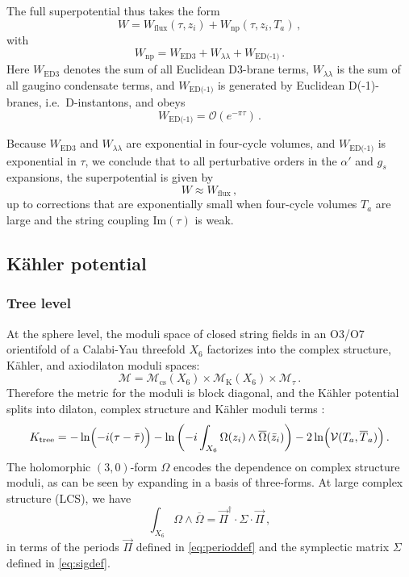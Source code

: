 \documentclass[12pt,a4wide]{article}
\def\V{\mathcal{V}}
\begin{document}
The full superpotential thus takes the form
\begin{equation}\label{eq:wtot}
W = W_{\text{flux}}(\tau,z_i) + W_{\text{np}}(\tau,z_i,T_a)\,,
\end{equation} with
\begin{equation}\label{eq:wnpgen}
W_{\text{np}} = W_{\text{ED3}} + W_{{\lambda\lambda}} +W_{\text{ED(-1)}}\,.
\end{equation}
Here $W_{\text{ED3}}$ denotes the sum of all Euclidean D3-brane terms, 
$W_{{\lambda\lambda}}$ is the sum of all gaugino condensate terms,
and $W_{\text{ED(-1)}}$ is generated by Euclidean D(-1)-branes, i.e.~D-instantons, and obeys
\begin{equation}\label{eq:wedminus}
W_{\text{ED(-1)}} = \mathcal{O}(e^{-\pi \tau})\,.
\end{equation}

 
Because $W_{\text{ED3}}$ and $W_{{\lambda\lambda}}$ are exponential in four-cycle volumes, and $W_{\text{ED(-1)}}$ is exponential in $\tau$, we conclude that to all perturbative orders in the $\alpha'$ and $g_s$ expansions, the superpotential is given by
\begin{equation}
W \approx W_{\text{flux}} \,,
\end{equation}
up to corrections that are exponentially small when four-cycle volumes $T_a$ are large and the string coupling $\text{Im}(\tau)$ is weak.


\subsection{K\"ahler potential}\label{ss:k}
\subsubsection{Tree level}\label{sss:ktree}
 
At the sphere level, the moduli space of closed string fields in an O3/O7 orientifold of a Calabi-Yau threefold $X_6$ factorizes into the complex structure, K\"ahler, and axiodilaton moduli spaces:
\begin{equation}
{\mathcal M}={\mathcal M}_{\text{cs}}(X_6)\times {\mathcal M}_{\text{K}}(X_6) \times {\mathcal M}_{\tau}\,.
\end{equation}
Therefore the
metric for the moduli is block diagonal, and the K\"ahler potential splits into dilaton, complex structure and K\"ahler moduli terms \cite{Grimm:2004uq}:
\begin{equation}\label{eq:ktree}
K_{\rm {tree}}=-\ln\Bigl(-{i}(\tau-\bar\tau)\Bigr)-\ln\left(-{i}\int_{X_6}\Omega(z_i)\wedge\overline{\Omega}({\bar z}_i )\right)-2\ln\Bigl(\V(T_a,{\overline{T}}_a)\Bigr)\,.
\end{equation}
The holomorphic $(3,0)$-form $\Omega$ encodes the dependence on complex structure moduli, as can be seen by expanding in a  basis of three-forms.  
At large complex structure (LCS), 
we have
\begin{equation}
\int_{X_6}\Omega \wedge\overline{\Omega} = \vec{\Pi}^{\dagger}{\cdot}\Sigma{\cdot}\vec{\Pi}\,,
\end{equation}
in terms of the periods $\vec{\Pi}$ defined in \eqref{eq:perioddef} and  the symplectic matrix $\Sigma$ defined in \eqref{eq:sigdef}.
\end{document}

